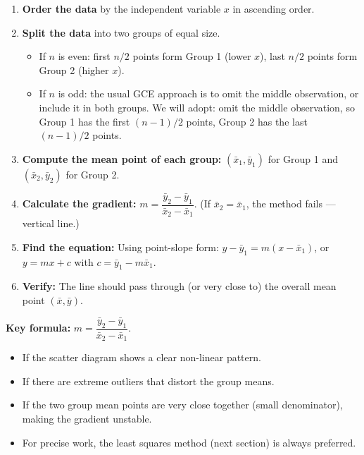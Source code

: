 \documentclass[11pt]{article}
\begin{document}
\begin{methode}
\begin{enumerate}
\item \textbf{Order the data} by the independent variable $x$ in ascending order.
\item \textbf{Split the data} into two groups of equal size.
\begin{itemize}
\item If $n$ is even: first $n/2$ points form Group 1 (lower $x$), last $n/2$ points form Group 2 (higher $x$).
\item If $n$ is odd: the usual GCE approach is to omit the middle observation, or include it in both groups. We will adopt: omit the middle observation, so Group 1 has the first $(n-1)/2$ points, Group 2 has the last $(n-1)/2$ points.
\end{itemize}
\item \textbf{Compute the mean point of each group:} $(\bar{x}_1, \bar{y}_1)$ for Group 1 and $(\bar{x}_2, \bar{y}_2)$ for Group 2.
\item \textbf{Calculate the gradient:} $m = \dfrac{\bar{y}_2 - \bar{y}_1}{\bar{x}_2 - \bar{x}_1}$. (If $\bar{x}_2 = \bar{x}_1$, the method fails — vertical line.)
\item \textbf{Find the equation:} Using point-slope form: $y - \bar{y}_1 = m(x - \bar{x}_1)$, or $y = mx + c$ with $c = \bar{y}_1 - m\bar{x}_1$.
\item \textbf{Verify:} The line should pass through (or very close to) the overall mean point $(\bar{x}, \bar{y})$.
\end{enumerate}
\textbf{Key formula:} $m = \dfrac{\bar{y}_2 - \bar{y}_1}{\bar{x}_2 - \bar{x}_1}$.
\end{methode}

\begin{attention}
\begin{itemize}
\item If the scatter diagram shows a clear non-linear pattern.
\item If there are extreme outliers that distort the group means.
\item If the two group mean points are very close together (small denominator), making the gradient unstable.
\item For precise work, the least squares method (next section) is always preferred.
\end{itemize}
\end{attention}
\end{document}
